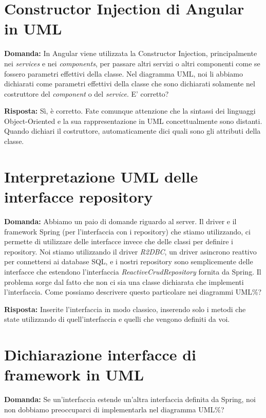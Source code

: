 \documentclass{article}
\begin{document}
\section{Constructor Injection di Angular in UML}%
\label{sec:constructor_injection_angular_uml} 

\textbf{Domanda:} In Angular viene utilizzata la Constructor Injection, principalmente nei \textit{services} e nei \textit{components}, per passare altri servizi o altri componenti come se fossero parametri effettivi della classe. Nel diagramma UML, noi li abbiamo dichiarati come parametri effettivi della classe che sono dichiarati solamente nel costruttore del \textit{component} o del \textit{service}. E' corretto?

\textbf{Risposta:} Sì, è corretto. Fate comunque attenzione che la sintassi dei linguaggi Object-Oriented e la sua rappresentazione in UML concettualmente sono distanti. Quando dichiari il costruttore, automaticamente dici quali sono gli attributi della classe.

\section{Interpretazione UML delle interfacce repository}%
\label{sec:interpretazione_uml_interfacce_repository}

\textbf{Domanda:} Abbiamo un paio di domande riguardo al server. Il driver e il framework Spring (per l'interfaccia con i repository) che stiamo utilizzando, ci permette di utilizzare delle interfacce invece che delle classi per definire i repository. Noi stiamo utilizzando il driver \textit{R2DBC}, un driver asincrono reattivo per connettersi ai database SQL, e i nostri repository sono semplicemente delle interfacce che estendono l'interfaccia \textit{ReactiveCrudRepository} fornita da Spring. Il problema sorge dal fatto che non ci sia una classe dichiarata che implementi l'interfaccia. Come possiamo descrivere questo particolare nei diagrammi UML\%?

\textbf{Risposta:} Inserite l'interfaccia in modo classico, inserendo solo i metodi che state utilizzando di quell'interfaccia e quelli che vengono definiti da voi.

\section{Dichiarazione interfacce di framework in UML}%
\label{sec:dichiarazione_interfacce_framework_uml}

\textbf{Domanda:} Se un'interfaccia estende un'altra interfaccia definita da Spring, noi non dobbiamo preoccuparci di implementarla nel diagramma UML\%?
\end{document}
